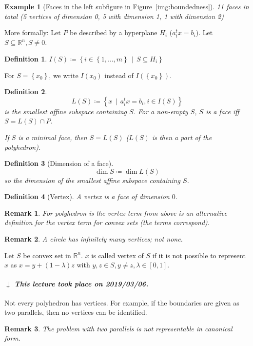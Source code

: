 \documentclass{article}
\numberwithin{lecref}{section}
\newtheorem*{Example}{Example}
\newtheorem*{Definition}{Definition}
\newtheorem*{Remark}{Remark}
\newcommand{\Set}[1]{\left\{#1\right\}}
\newcommand{\SetDef}[2]{\left\{#1\,\mid\,#2\right\}}
\newcommand{\dateref}[1]{%
  \begin{mdframed}[backgroundcolor=gray!10,innerbottommargin=0pt,innertopmargin=0pt]
    \paragraph{\textit{$\downarrow$ This lecture took place on #1.}}%
  \end{mdframed}%
}
\begin{document}
\begin{Example}[Faces in the left subfigure in Figure~\ref{img:boundedness}]
	11 faces in total (5 vertices of dimension 0, 5 with dimension 1, 1 with dimension 2)
\end{Example}

More formally:
Let $P$ be described by a hyperplane $H_i$ ($a_i^t x = b_i$).
Let $S \subseteq \mathbb R^n, S \neq 0$.
\begin{Definition}
	$I(S) \coloneqq \SetDef{i \in \Set{1, \dots, m}}{S \subseteq H_i}$
\end{Definition}
For $S = \Set{x_0}$, we write $I(x_0)$ instead of $I(\Set{x_0})$.

\begin{Definition}
	\[ L(S) \coloneqq \SetDef{x}{a_i^t x = b_i, i \in I(S)} \]
	is the smallest affine subspace containing $S$.
	For a non-empty $S$, $S$ is a face iff $S = L(S) \cap P$.

	If $S$ is a minimal face, then $S = L(S)$ ($L(S)$ is then a part of the polyhedron).
\end{Definition}

\begin{Definition}[Dimension of a face]
	\[ \dim{S} \coloneqq \dim{L(S)} \]
	so the dimension of the smallest affine subspace containing $S$.
\end{Definition}
\begin{Definition}[Vertex]
	A vertex is a face of dimension $0$.
\end{Definition}
\begin{Remark}
	For polyhedron is the vertex term from above is an alternative definition for the vertex term for convex sets (the terms correspond).
\end{Remark}
\begin{Remark}
	A circle has infinitely many vertices; not none.
\end{Remark}

Let $S$ be convex set in $\mathbb R^n$.
$x$ is called vertex of $S$ if it is not possible to represent $x$ as $x = y + (1 - \lambda) z$ with $y, z \in S, y \neq z, \lambda \in [0,1]$.

\dateref{2019/03/06}


Not every polyhedron has vertices. For example, if the boundaries are given as two parallels, then no vertices can be identified.

\begin{Remark}
	The problem with two parallels is not representable in canonical form.
\end{Remark}
\end{document}
